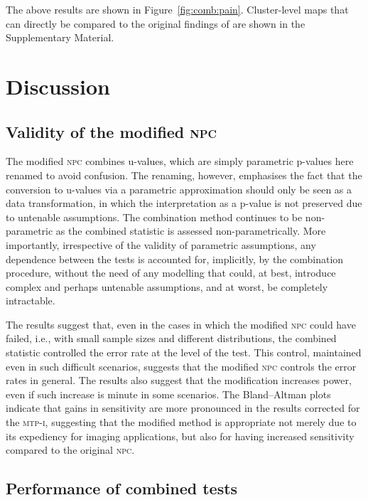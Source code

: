 The above results are shown in Figure~\ref{fig:comb:pain}. Cluster-level maps that can directly be compared to the original findings of \citet{Brooks2005} are shown in the Supplementary Material.

\section{Discussion}

\subsection{Validity of the modified \textsc{npc}}

The modified \textsc{npc} combines u-values, which are simply parametric p-values here renamed to avoid confusion. The renaming, however, emphasises the fact that the conversion to u-values via a parametric approximation should only be seen as a data transformation, in which the interpretation as a p-value is not preserved due to untenable assumptions. The combination method continues to be non-parametric as the combined statistic is assessed non-parametrically. More importantly, irrespective of the validity of parametric assumptions, any dependence between the tests is accounted for, implicitly, by the combination procedure, without the need of any modelling that could, at best, introduce complex and perhaps untenable assumptions, and at worst, be completely intractable.

The results suggest that, even in the cases in which the modified \textsc{npc} could have failed, i.e., with small sample sizes and different distributions, the combined statistic controlled the error rate at the level of the test. This control, maintained even in such difficult scenarios, suggests that the modified \textsc{npc} controls the error rates in general. The results also suggest that the modification increases power, even if such increase is minute in some scenarios. The Bland--Altman plots indicate that gains in sensitivity are more pronounced in the results corrected for the \textsc{mtp-i}, suggesting that the modified method is appropriate not merely due to its expediency for imaging applications, but also for having increased sensitivity compared to the original \textsc{npc}.

\subsection{Performance of combined tests}

